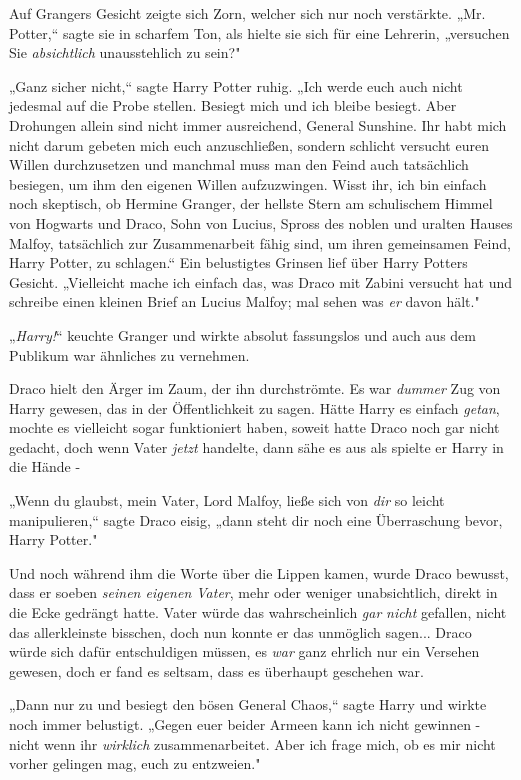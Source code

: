 {Auf Grangers Gesicht zeigte sich Zorn, welcher sich nur noch verstärkte. „Mr. Potter,“ sagte sie in scharfem Ton, als hielte sie sich für eine Lehrerin, „versuchen Sie \emph{absichtlich} unausstehlich zu sein?"

„Ganz sicher nicht,“ sagte Harry Potter ruhig. „Ich werde euch auch nicht jedesmal auf die Probe stellen. Besiegt mich und ich bleibe besiegt. Aber Drohungen allein sind nicht immer ausreichend, General Sunshine. Ihr habt mich nicht darum gebeten mich euch anzuschließen, sondern schlicht versucht euren Willen durchzusetzen und manchmal muss man den Feind auch tatsächlich besiegen, um ihm den eigenen Willen aufzuzwingen. Wisst ihr, ich bin einfach noch skeptisch, ob Hermine Granger, der hellste Stern am schulischem Himmel von Hogwarts und Draco, Sohn von Lucius, Spross des noblen und uralten Hauses Malfoy, tatsächlich zur Zusammenarbeit fähig sind, um ihren gemeinsamen Feind, Harry Potter, zu schlagen.“ Ein belustigtes Grinsen lief über Harry Potters Gesicht. „Vielleicht mache ich einfach das, was Draco mit Zabini versucht hat und schreibe einen kleinen Brief an Lucius Malfoy; mal sehen was \emph{er} davon hält."

„\emph{Harry!}“ keuchte Granger und wirkte absolut fassungslos und auch aus dem Publikum war ähnliches zu vernehmen.

Draco hielt den Ärger im Zaum, der ihn durchströmte. Es war \emph{dummer} Zug von Harry gewesen, das in der Öffentlichkeit zu sagen. Hätte Harry es einfach \emph{getan}, mochte es vielleicht sogar funktioniert haben, soweit hatte Draco noch gar nicht gedacht, doch wenn Vater \emph{jetzt} handelte, dann sähe es aus als spielte er Harry in die Hände -

„Wenn du glaubst, mein Vater, Lord Malfoy, ließe sich von \emph{dir} so leicht manipulieren,“ sagte Draco eisig, „dann steht dir noch eine Überraschung bevor, Harry Potter."

Und noch während ihm die Worte über die Lippen kamen, wurde Draco bewusst, dass er soeben \emph{seinen eigenen Vater}, mehr oder weniger unabsichtlich, direkt in die Ecke gedrängt hatte. Vater würde das wahrscheinlich \emph{gar} \emph{nicht} gefallen, nicht das allerkleinste bisschen, doch nun konnte er das unmöglich sagen... Draco würde sich dafür entschuldigen müssen, es \emph{war} ganz ehrlich nur ein Versehen gewesen, doch er fand es seltsam, dass es überhaupt geschehen war.

„Dann nur zu und besiegt den bösen General Chaos,“ sagte Harry und wirkte noch immer belustigt. „Gegen euer beider Armeen kann ich nicht gewinnen - nicht wenn ihr \emph{wirklich} zusammenarbeitet. Aber ich frage mich, ob es mir nicht vorher gelingen mag, euch zu entzweien."

}
